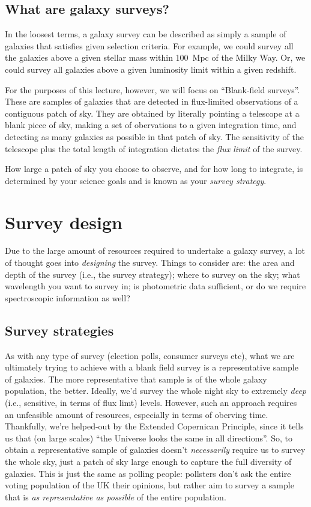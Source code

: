 \documentclass[11pt]{article}
\begin{document}
\subsection{What are galaxy surveys?}
In the loosest terms, a galaxy survey can be described as simply a
sample of galaxies that satisfies given selection criteria. For
example, we could survey all the galaxies above a given stellar mass
within 100~Mpc of the Milky Way. Or, we could survey all galaxies
above a given luminosity limit within a given redshift.

For the purposes of this lecture, however, we will focus on
``Blank-field surveys''. These are samples of galaxies that are detected in
flux-limited observations of a contiguous patch of sky. They are
obtained by literally pointing a telescope at a blank piece of sky,
making a set of obervations to a given integration time, and detecting
as many galaxies as possible in that patch of sky. The sensitivity of
the telescope plus the total length of integration dictates the {\it
  flux limit} of the survey.

How large a patch of sky you choose to observe, and for how long to
integrate, is determined by your science goals and is known as your
{\it survey strategy}.

\section{Survey design}
Due to the large amount of resources required to undertake a galaxy
survey, a lot of thought goes into {\it designing} the survey. Things
to consider are: the area and depth of the survey (i.e., the survey
strategy); where to survey on the sky; what wavelength you want to
survey in; is photometric data sufficient, or do we require
spectroscopic information as well?

\subsection{Survey strategies}
As with any type of survey (election polls, consumer surveys etc),
what we are ultimately trying to achieve with a blank field survey is
a representative sample of galaxies. The more representative that
sample is of the whole galaxy population, the better. Ideally, we'd
survey the whole night sky to extremely {\it deep} (i.e., sensitive,
in terms of flux limt) levels. However, such an approach requires an
unfeasible amount of resources, especially in terms of oberving
time. Thankfully, we're helped-out by the Extended Copernican
Principle, since it tells us that (on large scales) ``the Universe
looks the same in all directions''. So, to obtain a representative
sample of galaxies doesn't {\it necessarily} require us to survey the
whole sky, just a patch of sky large enough to capture the full
diversity of galaxies. This is just the same as polling people:
pollsters don't ask the entire voting population of the UK their
opinions, but rather aim to survey a sample that is {\it as
  representative as possible} of the entire population.
\end{document}
